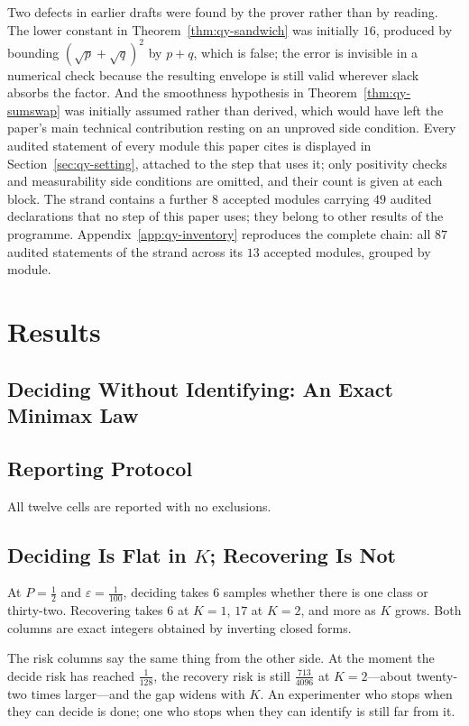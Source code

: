 Two defects in earlier drafts were found by the prover rather than by reading. The lower
constant in Theorem~\ref{thm:qy-sandwich} was initially $16$, produced by bounding
$(\sqrt{p}+\sqrt{q})^{2}$ by $p+q$, which is false; the error is invisible in a numerical
check because the resulting envelope is still valid wherever slack absorbs the factor. And the
smoothness hypothesis in Theorem~\ref{thm:qy-sumswap} was initially assumed rather than derived,
which would have left the paper's main technical contribution resting on an unproved side
condition. Every audited statement of every module this paper cites is displayed in Section~\ref{sec:qy-setting}, attached to the step that uses it; only positivity checks and measurability side conditions are omitted, and their count is given at each block. The strand contains a further $8$ accepted modules carrying $49$ audited declarations that no step of this paper uses; they belong to other results of the programme. Appendix~\ref{app:qy-inventory} reproduces the complete chain: all $87$ audited statements of the strand across its $13$ accepted modules, grouped by module.


\section{Results}

\subsection{Deciding Without Identifying: An Exact Minimax Law}
\label{sec:sp-results}

\subsection{Reporting Protocol}

All twelve cells are reported with no exclusions.

\subsection{Deciding Is Flat in $K$; Recovering Is Not}

At $P=\tfrac12$ and $\varepsilon=\tfrac{1}{100}$, deciding takes $6$ samples whether there is
one class or thirty-two. Recovering takes $6$ at $K=1$, $17$ at $K=2$, and more as $K$ grows.
Both columns are exact integers obtained by inverting closed forms.

The risk columns say the same thing from the other side. At the moment the decide risk has
reached $\tfrac{1}{128}$, the recovery risk is still $\tfrac{713}{4096}$ at $K=2$---about
twenty-two times larger---and the gap widens with $K$. An experimenter who stops when they can
decide is done; one who stops when they can identify is still far from it.

